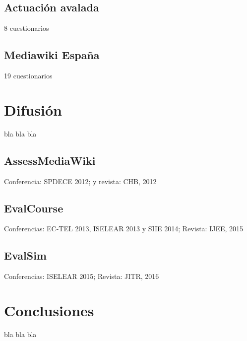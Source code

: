 	\subsection{Actuación avalada}

		8 cuestionarios

	\subsection{Mediawiki España}

		19 cuestionarios

\section{Difusión}

	bla bla bla

	\subsection{AssessMediaWiki}

		Conferencia: SPDECE 2012; y revista: CHB, 2012

	\subsection{EvalCourse}

		Conferencias: EC-TEL 2013, ISELEAR 2013 y SIIE 2014; Revista: IJEE, 2015

	\subsection{EvalSim}

		Conferencias: ISELEAR 2015; Revista: JITR, 2016

\section{Conclusiones}

	bla bla bla